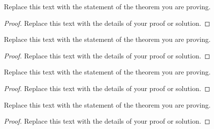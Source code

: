 \documentclass{article}
\newenvironment{problem}[2][Problem]{\begin{trivlist}
\item[\hskip \labelsep {\bfseries #1}\hskip \labelsep {\bfseries #2.}]}{\end{trivlist}}
\begin{document}
\vspace{0.25in} %

\begin{problem}{3}
Replace this text with the statement of the theorem you are proving.
\end{problem}

\begin{proof}
Replace this text with the details of your proof or solution.
\end{proof}


\vspace{0.25in} %

\begin{problem}{4}
Replace this text with the statement of the theorem you are proving.
\end{problem}

\begin{proof}
Replace this text with the details of your proof or solution.
\end{proof}


\vspace{0.25in} %

\begin{problem}{5}
Replace this text with the statement of the theorem you are proving.
\end{problem}

\begin{proof}
Replace this text with the details of your proof or solution.
\end{proof}


\vspace{0.25in} %

\begin{problem}{6}
Replace this text with the statement of the theorem you are proving.
\end{problem}

\begin{proof}
Replace this text with the details of your proof or solution.
\end{proof}
\end{document}
